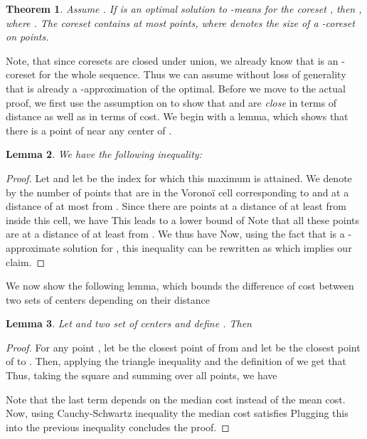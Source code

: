 \documentclass[a4paper,11pt,oneside,english,onecolumn]{article}
\newtheorem{theorem}{Theorem}
\newtheorem{lemma}[theorem]{Lemma}
\theoremstyle{definition}
\begin{document}
\begin{theorem}
\label{th:improvingClustering}
Assume . If  is an optimal solution to -means for the coreset , then , where . The coreset  contains at most  points, where  denotes the size of a -coreset on  points.

\end{theorem}
\bigskip
Note, that since coresets are closed under union, we already know that  is an -coreset for the whole sequence. Thus we can assume without loss of generality that  is already a -approximation of the optimal. Before we move to the actual proof, we first use the assumption on  to show that  and  are \emph{close} in terms of distance as well as in terms of cost. We begin with a lemma, which shows that there is a point of  near any center of .
\begin{lemma}
\label{lemma:distanceToCenters}
We have the following inequality:

\end{lemma}
\begin{proof}
Let  and let  be the index for which this maximum is attained. We denote by  the number of points that are in the Vorono\"i cell corresponding to  and at a distance of at most  from . Since there are  points at a distance of at least  from  inside this cell, we have  This leads to a lower bound of 
Note that all these points are at a distance of at least  from . We thus have 
Now, using the fact that  is a -approximate solution for , this inequality can be rewritten as 
which implies our claim.
\end{proof}

We now show the following lemma, which bounds the difference of cost between two sets of centers depending on their distance
\begin{lemma}
\label{lemma:ineqCostMean}
Let  and  two set of centers and define . Then 
\end{lemma}

\begin{proof}
For any point , let  be the closest point of  from  and let  be the closest point of  to . Then, applying the triangle inequality and the definition of  we get that
 Thus, taking the square and summing over all points, we have

Note that the last term depends on the median cost instead of the mean cost.
Now, using Cauchy-Schwartz inequality the median cost satisfies
 Plugging this into the previous inequality concludes the proof.
\end{proof}
\end{document}

